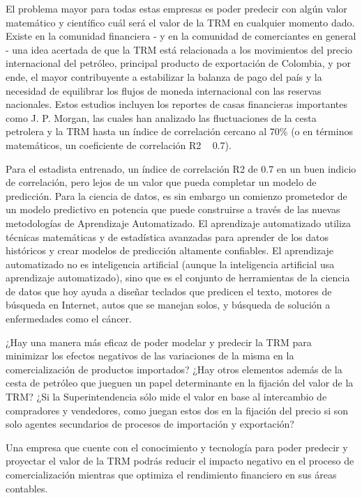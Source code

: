 El problema mayor para todas estas empresas es poder predecir con algún valor matemático y científico cuál será el valor de la TRM en cualquier momento dado. Existe en la comunidad financiera - y en la comunidad de comerciantes en general - una idea acertada de que la TRM está relacionada a los movimientos del precio internacional del petróleo, principal producto de exportación de Colombia, y por ende, el mayor contribuyente a estabilizar la balanza de pago del país y la necesidad de equilibrar los flujos de moneda internacional con las reservas nacionales. Estos estudios incluyen los reportes de casas financieras importantes como J. P. Morgan, las cuales han analizado las fluctuaciones de la cesta petrolera y la TRM hasta un índice de correlación cercano al 70\% (o en términos matemáticos, un coeficiente de correlación R2 ~ 0.7). 

Para el estadista entrenado, un índice de correlación R2 de 0.7 en un buen indicio de correlación, pero lejos de un valor que pueda completar un modelo de predicción. Para la ciencia de datos, es sin embargo un comienzo prometedor de un modelo predictivo en potencia que puede construirse a través de las nuevas metodologías de Aprendizaje Automatizado. El aprendizaje automatizado utiliza técnicas matemáticas y de estadística avanzadas para aprender de los datos históricos y crear modelos de predicción altamente confiables. El aprendizaje automatizado no es inteligencia artificial (aunque la inteligencia artificial usa aprendizaje automatizado), sino que es el conjunto de herramientas de la ciencia de datos que hoy ayuda a diseñar teclados que predicen el texto, motores de búsqueda en Internet, autos que se manejan solos, y búsqueda de solución a enfermedades como el cáncer. 

¿Hay una manera más eficaz de poder modelar y predecir la TRM para minimizar los efectos negativos de las variaciones de la misma en la comercialización de productos importados? ¿Hay otros elementos además de la cesta de petróleo que jueguen un papel determinante en la fijación del valor de la TRM? ¿Si la Superintendencia sólo mide el valor en base al intercambio de compradores y vendedores, como juegan estos dos en la fijación del precio si son solo agentes secundarios de procesos de importación y exportación?

Una empresa que cuente con el conocimiento y tecnología para poder predecir y proyectar el valor de la TRM podrás reducir el impacto negativo en el proceso de comercialización mientras que optimiza el rendimiento financiero en sus áreas contables. 

